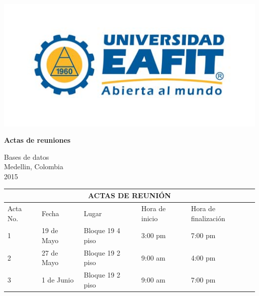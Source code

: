 \documentclass{article}
\begin{document}
    \begin{minipage}{0.5\textwidth}
        \includegraphics[scale=1]{Logo}
    \end{minipage}
    \hfill
    \begin{minipage}{0.5\textwidth}
        \begin{center}
            \begin{Huge}
                \textbf{Actas de reuniones \\}
            \end{Huge}
            Bases de datos \\
            Medellin, Colombia \\
            2015
        \end{center}
    \end{minipage}

    \vspace{1cm}

    \begin{tabularx}{\textwidth}{ |X|X|X|X|X| }
        \hline
        \multicolumn{5}{|c|}{\cellcolor{blue} ACTAS DE REUNI\'ON} \\
        \hline
        Acta No. & Fecha & Lugar & Hora de inicio & Hora de finalizaci\'on \\
        \hline
        1 & 19 de Mayo & Bloque 19 4 piso & 3:00 pm & 7:00 pm \\
        \hline
        2 & 27 de Mayo & Bloque 19 2 piso & 9:00 am & 4:00 pm \\
        \hline
        3 & 1 de Junio & Bloque 19 2 piso & 9:00 am & 7:00 pm \\
        \hline
    \end{tabularx}

    \vspace{1cm}
\end{document}
